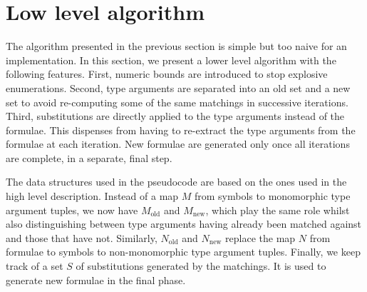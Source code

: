 \documentclass[]{ceurart}
\begin{document}
\section{Low level algorithm}
\label{sec:low-level-algorithm}

The algorithm presented in the previous section is simple but too naive for an implementation. In this section, we present a lower level algorithm with the following features.
First, numeric bounds are introduced to stop explosive enumerations.
Second, type arguments are separated into an old set and a new set to avoid re-computing some of the same matchings in successive iterations.
Third, substitutions are directly applied to the type arguments instead of the formulae. This dispenses from having to re-extract the type arguments from the formulae at each iteration. New formulae are generated only once all iterations are complete, in a separate, final step.

The data structures used in the pseudocode are based on the ones used in the high level description. Instead of a map \(M\) from symbols to monomorphic type argument tuples, we now have \(M_\text{old}\) and \(M_\text{new}\), which play the same role whilst also distinguishing between type arguments having already been matched against and those that have not. Similarly, \(N_\text{old}\) and \(N_\text{new}\) replace the map \(N\) from formulae to symbols to non-monomorphic type argument tuples. Finally, we keep track of a set \(S\) of substitutions generated by the matchings. It is used to generate new formulae in the final phase.
\end{document}
